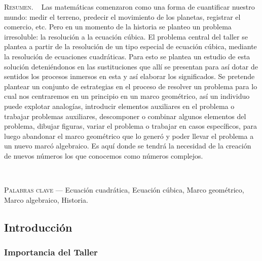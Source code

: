 \begin{center}
	\begin{minipage}{0.75\linewidth} \small
		\textsc{Resumen}. ~
		Las matemáticas comenzaron como una forma de cuantificar nuestro mundo: medir el terreno, predecir el movimiento de los planetas, registrar el comercio, etc. Pero en un momento de la historia se planteo un problema irresoluble: la resolución a la ecuación cúbica. El problema central del taller se plantea a partir de la resolución de un tipo especial de ecuación cúbica, mediante la resolución de ecuaciones cuadráticas. Para esto se plantea un estudio de esta solución deteniéndonos en las sustituciones que allí se presentan para así dotar de sentidos los procesos inmersos en esta y así elaborar los significados. Se pretende plantear un conjunto de estrategias en el proceso de resolver un problema para lo cual nos centraremos en un principio en un marco geométrico, así un individuo puede explotar analogías, introducir elementos auxiliares en el problema o trabajar problemas auxiliares, descomponer o combinar algunos elementos del problema, dibujar figuras, variar el problema o trabajar en casos específicos, para luego abandonar el marco geométrico que lo generó y poder llevar el problema a un nuevo marcó algebraico. Es aquí donde se tendrá la necesidad de la creación de nuevos números los que conocemos como números complejos.
	\end{minipage}\\
	
	\vspace{0.5em}
	
	\begin{minipage}{0.75\linewidth} \small
		\textsc{Palabras clave} --- Ecuación cuadrática, Ecuación cúbica, Marco geométrico, Marco algebraico, Historia.
	\end{minipage}
\end{center}

\subsection{Introducción}

\subsubsection{Importancia del Taller}

